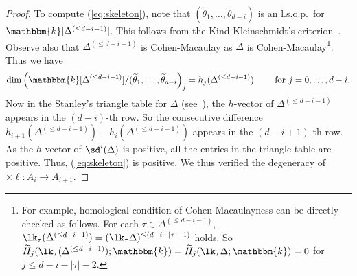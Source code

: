 \begin{proof}
To compute (\ref{eq:skeleton}), note that $(\widetilde{\theta}_1,\ldots,\widetilde{\theta}_{d-i})$ is an l.s.o.p.~for $\mathbbm{k}[\Delta^{(\leq d-i-1)}]$. 
This follows from the Kind-Kleinschmidt's criterion~\cite[Lemma III.2.4]{Sta-book}.
Observe also that $\Delta^{(\leq d - i-1)}$ is Cohen-Macaulay as $\Delta$ is Cohen-Macaulay\footnote{For example, homological condition of Cohen-Macaulayness can be directly checked as follows. For each $\tau \in \Delta^{(\leq d- i-1)}$, $\lk_\tau(\Delta^{(\leq d- i-1)}) =(\lk_\tau \Delta )^{\leq (d-i-|\tau| -1)}$ holds. So $\widetilde{H}_j(\lk_\tau(\Delta^{(\leq d- i-1)});\mathbbm{k})=\widetilde{H}_j(\lk_\tau \Delta;\mathbbm{k})=0$ for $j \leq d-i-|\tau|-2$.}.
Thus we have
\[
\dim \left(\mathbbm{k}[\Delta^{(\leq d- i-1)}]/(\widetilde{\theta}_1,\ldots,\widetilde{\theta}_{d-i}\right)_{j}=
h_{j}(\Delta^{(\leq d-i-1)}) \qquad \text{ for } j=0,\ldots,d-i.
\]
Now in the Stanley's triangle table for $\Delta$ (see~\cite[p.250]{Zie}), the $h$-vector of $\Delta^{(\leq d-i-1)}$ appears in the $(d-i)$-th row. So the consecutive difference $h_{i+1}(\Delta^{(\leq d-i-1)})-h_{i}(\Delta^{(\leq d-i-1)})$ appears in the $(d-i+1)$-th row. As the $h$-vector of $\sd^i(\Delta)$ is positive, all the entries in the triangle table are positive. Thus, (\ref{eq:skeleton}) is positive. 
We thus verified the degeneracy of $\times\ell:A_i \rightarrow A_{i+1}$.
\end{proof}


 
